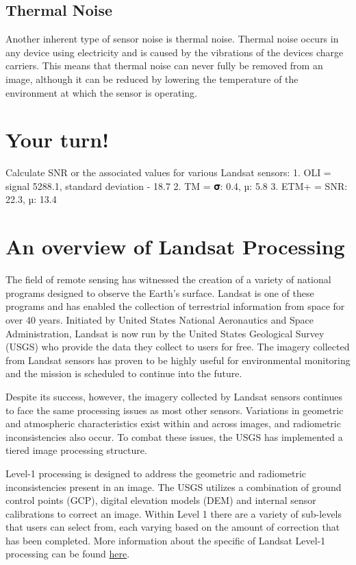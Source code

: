\documentclass[
]{book}
\begin{document}
\subsection{Thermal Noise}\label{thermal-noise}

Another inherent type of sensor noise is thermal noise. Thermal noise occurs in any device using electricity and is caused by the vibrations of the devices charge carriers. This means that thermal noise can never fully be removed from an image, although it can be reduced by lowering the temperature of the environment at which the sensor is operating.

\section*{Your turn!}\label{your-turn-4}

Calculate SNR or the associated values for various Landsat sensors:
1. OLI = signal 5288.1, standard deviation - 18.7
2. TM = 𝛔: 0.4, µ: 5.8
3. ETM+ = SNR: 22.3, µ: 13.4

\section{An overview of Landsat Processing}\label{an-overview-of-landsat-processing}

The field of remote sensing has witnessed the creation of a variety of national programs designed to observe the Earth's surface. Landsat is one of these programs and has enabled the collection of terrestrial information from space for over 40 years. Initiated by United States National Aeronautics and Space Administration, Landsat is now run by the United States Geological Survey (USGS) who provide the data they collect to users for free. The imagery collected from Landsat sensors has proven to be highly useful for environmental monitoring and the mission is scheduled to continue into the future.

Despite its success, however, the imagery collected by Landsat sensors continues to face the same processing issues as most other sensors. Variations in geometric and atmospheric characteristics exist within and across images, and radiometric inconsistencies also occur. To combat these issues, the USGS has implemented a tiered image processing structure.

Level-1 processing is designed to address the geometric and radiometric inconsistencies present in an image. The USGS utilizes a combination of ground control points (GCP), digital elevation models (DEM) and internal sensor calibrations to correct an image. Within Level 1 there are a variety of sub-levels that users can select from, each varying based on the amount of correction that has been completed. More information about the specific of Landsat Level-1 processing can be found \href{https://www.usgs.gov/core-science-systems/nli/landsat/landsat-level-1-processing-details}{here}.
\end{document}
